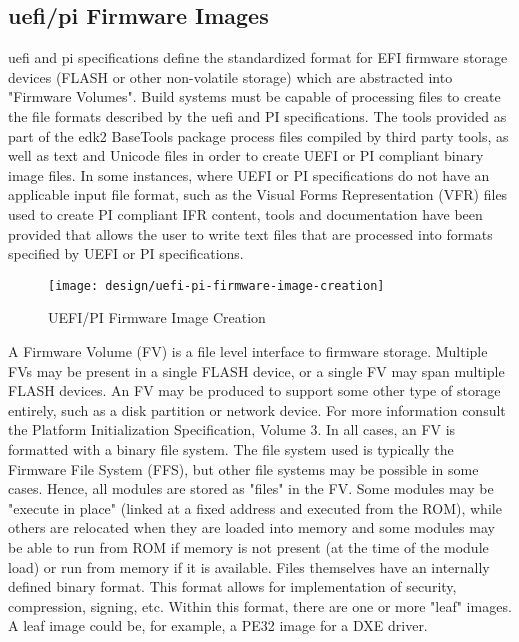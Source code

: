 \subsection{\gls{uefi}/\gls{pi} Firmware Images}
\gls{uefi} and \gls{pi} specifications define the standardized format for EFI firmware storage devices (FLASH or other non-volatile storage) which are abstracted into "Firmware Volumes". Build systems must be capable of processing files to create the file formats described by the \gls{uefi} and PI specifications. The tools provided as part of the \gls{edk2} BaseTools package process files compiled by third party tools, as well as text and Unicode files in order to create UEFI or PI compliant binary image files. In some instances, where UEFI or PI specifications do not have an applicable input file format, such as the Visual Forms Representation (VFR) files used to create PI compliant IFR content, tools and documentation have been provided that allows the user to write text files that are processed into formats specified by UEFI or PI specifications.

\begin{figure}[h]
	\centering
	\texttt{[image: design/uefi-pi-firmware-image-creation]}
	\caption{UEFI/PI Firmware Image Creation}\label{fig:design-uefi-pi-firmware-image-creation}
\end{figure}

A Firmware Volume (FV) is a file level interface to firmware storage. Multiple FVs may be present in a single FLASH device, or a single FV may span multiple FLASH devices. An FV may be produced to support some other type of storage entirely, such as a disk partition or network device. For more information consult the Platform Initialization Specification, Volume 3.
In all cases, an FV is formatted with a binary file system. The file system used is typically the Firmware File System (FFS), but other file systems may be possible in some cases. Hence, all modules are stored as "files" in the FV. Some modules may be "execute in place" (linked at a fixed address and executed from the ROM), while others are relocated when they are loaded into memory and some modules may be able to run from ROM if memory is not present (at the time of the module load) or run from memory if it is available.
Files themselves have an internally defined binary format. This format allows for implementation of security, compression, signing, etc. Within this format, there are one or more "leaf" images. A leaf image could be, for example, a PE32 image for a DXE driver.

